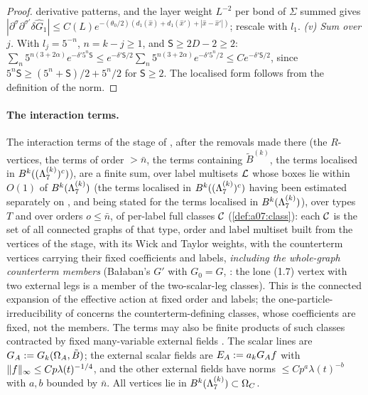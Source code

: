 \begin{proof}
derivative patterns, and the layer weight $L^{-2}$ per bond of $\Sigma$ summed gives $|\partial^\sigma\partial^{\sigma'}\delta\hat G_1|\le C(L)e^{-(\theta_0/2)(d_1(\hat x)+d_1(\hat x')+|\hat x-\hat x'|)}$; rescale with $l_1$. \emph{(v) Sum over $j$.} With $l_j=5^{-n}$, $n=k-j\ge1$, and $\mathsf S\ge2D-2\ge2$: $\sum_n5^{n(3+2\alpha)}e^{-\delta'5^n\mathsf S}\le e^{-\delta'\mathsf S/2}\sum_n5^{n(3+2\alpha)}e^{-\delta'5^n/2}\le Ce^{-\delta'\mathsf S/2}$, since $5^n\mathsf S\ge(5^n+\mathsf S)/2+5^n/2$ for $\mathsf S\ge2$. The localised form follows from the definition of the norm.
\end{proof}

\paragraph{The interaction terms.} The interaction terms of the stage of \cite[p.~579]{Ba2}, after the removals made there (the $R$-vertices, the terms of order $>\bar n$, the terms containing $\tilde B^{(k)}$, the terms localised in $B^k((\Lambda^{(k)}_{7})^c)$), are a finite sum, over label multisets $\mathcal L$ whose boxes lie within $O(1)$ of $B^k(\Lambda^{(k)}_{7})$ (the terms localised in $B^k((\Lambda^{(k)}_{7})^c)$ having been estimated separately on \cite[p.~579]{Ba2}, and \cite[Prop.~2.6]{Ba2} being stated for the terms localised in $B^k(\Lambda^{(k)}_{7})$), over types $T$ and over orders $o\le\bar n$, of per-label full classes $\mathcal C$ (\cref{def:a07:class}): each $\mathcal C$ is the set of all connected graphs of that type, order and label multiset built from the vertices \cite[(1.6)--(1.15)]{Ba3} of the stage, with its Wick and Taylor weights, with the counterterm vertices \cite[(1.7)]{Ba3} carrying their fixed coefficients \cite[(1.23), (1.29)]{Ba3} and labels, \emph{including the whole-graph counterterm members} (Ba{\l}aban's $G'$ with $G_0=G$, \cite[p.~420]{Ba3}: the lone (1.7) vertex with two external legs is a member of the two-scalar-leg classes). This is the connected expansion of the effective action at fixed order and labels; the one-particle-irreducibility of \cite[p.~430]{Ba3} concerns the counterterm-defining classes, whose coefficients are fixed, not the members. The terms may also be finite products of such classes contracted by fixed many-variable external fields \cite[p.~419]{Ba3}. The scalar lines are $G_A:= G_k(\Omega_{A},\tilde B)$; the external scalar fields are $E_A:= a_kG_Af$ with $\lVert f\rVert_\infty\le Cp\lambda(t)^{-1/4}$, and the other external fields have norms $\le Cp^a\lambda(t)^{-b}$ with $a,b$ bounded by $\bar n$. All vertices lie in $B^k(\Lambda^{(k)}_{7})\subset\Omega_{C}$.

